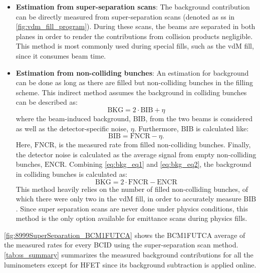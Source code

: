 \begin{itemize}
	\item \textbf{Estimation from super-separation scans}: The background contribution can be directly measured from super-separation scans (denoted as ss in \autoref{fig:vdm_fill_program}). During these scans, the beams are separated in both planes in order to render the contributions from collision products negligible. This method is most commonly used during special fills, such as the vdM fill, since it consumes beam time.
	\item \textbf{Estimation from non-colliding bunches}: An estimation for background can be done as long as there are filled but non-colliding bunches in the filling scheme. This indirect method assumes the background in colliding bunches can be described as:
	\begin{equation}
		\label{eq:bkg_eq1}
		\mathrm{BKG} = 2 \cdot \mathrm{BIB} + \eta
	\end{equation}
	where the beam-induced background, $\mathrm{BIB}$, from the two beams is considered as well as the detector-specific noise, $\eta$. Furthermore, $\mathrm{BIB}$ is calculated like:
	\begin{equation}
		\label{eq:bkg_eq2}
		\mathrm{BIB} = \mathrm{FNCR} - \eta.
	\end{equation}
	Here, $\mathrm{FNCR}$, is the measured rate from filled non-colliding bunches. Finally, the detector noise is calculated as the average signal from empty non-colliding bunches, $\mathrm{ENCR}$. Combining \autoref{eq:bkg_eq1} and \autoref{eq:bkg_eq2}, the background in colliding bunches is calculated as:
	\begin{equation}
		\mathrm{BKG} = 2 \cdot \mathrm{FNCR} - \mathrm{ENCR}
	\end{equation}
    This method heavily relies on the number of filled non-colliding bunches, of which there were only two in the vdM fill, in order to accurately measure $\mathrm{BIB}$. Since super separation scans are never done under physics conditions, this method is the only option available for emittance scans during physics fills.
\end{itemize}

\autoref{fig:8999SuperSeparation_BCM1FUTCA} shows the BCM1FUTCA average of the measured rates for every BCID using the super-separation scan method. \autoref{tab:ss_summary} summarizes the measured background contributions for all the luminometers except for HFET since its background subtraction is applied online.

